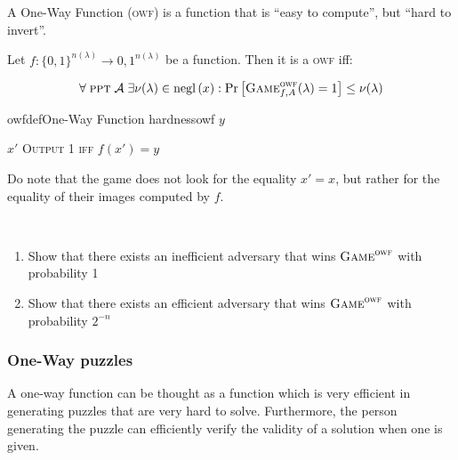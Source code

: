 A One-Way Function (\textsc{owf}) is a function that is ``easy to compute'', but ``hard to invert''.

\begin{definition}    
    Let $f : \{0,1\}^{n(\lambda)} \to {0,1}^{n(\lambda)}$ be a function. Then it is a \textsc{owf} iff:

    \begin{equation}
        \forall\; \textsc{ppt}\; \mathcal{A}\;
        \exists\nu(\lambda) \in \mathrm{negl}\left({x}\right) :
        \Pr \left[ \textsc{Game}_{f,A}^\textsc{owf} (\lambda) = 1 \right]
        \leq \nu(\lambda)
    \end{equation}

\end{definition}


\begin{cryptogame}{owfdef}{One-Way Function hardness}{owf}
    {$y$}
    {}

    \cseqdelay

    \send{}
    {$x'$}
    {\textsc{Output 1 iff} $f(x')=y$}

\end{cryptogame}

Do note that the game does not look for the equality $x' = x$, but rather for the equality of their images computed by $f$.

\pagebreak

\begin{exercise}
    \
    \begin{enumerate}
        \item Show that there exists an inefficient adversary that wins $\textsc{Game}^\textsc{owf}$ with probability 1
        \item Show that there exists an efficient adversary that wins $\textsc{Game}^\textsc{owf}$ with probability $2^{-n}$
    \end{enumerate}
\end{exercise}


\subsubsection{One-Way puzzles}
A one-way function can be thought as a function which is very efficient in generating puzzles that are very hard to solve. Furthermore, the person generating the puzzle can efficiently verify the validity of a solution when one is given.


